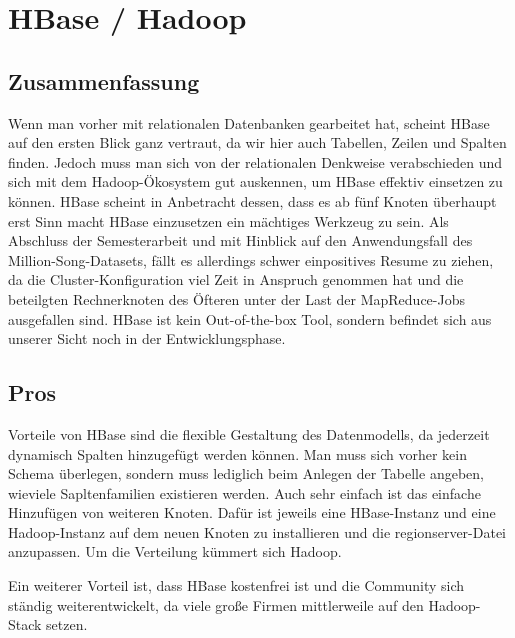 \section{HBase / Hadoop}
\subsection{Zusammenfassung}
Wenn man vorher mit relationalen Datenbanken gearbeitet hat, scheint HBase auf den ersten Blick ganz vertraut, da wir hier auch Tabellen, Zeilen und Spalten finden. Jedoch muss man sich von der relationalen Denkweise verabschieden und sich mit dem Hadoop-Ökosystem gut auskennen, um HBase effektiv einsetzen zu können. HBase scheint in Anbetracht dessen, dass es ab fünf Knoten überhaupt erst Sinn macht HBase einzusetzen ein mächtiges Werkzeug zu sein. Als Abschluss der Semesterarbeit und mit Hinblick auf den Anwendungsfall des Million-Song-Datasets, fällt es allerdings schwer einpositives Resume zu ziehen, da die Cluster-Konfiguration viel Zeit in Anspruch genommen hat und die beteilgten Rechnerknoten des Öfteren unter der Last der MapReduce-Jobs ausgefallen sind. HBase ist kein Out-of-the-box Tool, sondern befindet sich aus unserer Sicht noch in der Entwicklungsphase.

\subsection{Pros}
Vorteile von HBase sind die flexible Gestaltung des Datenmodells, da jederzeit dynamisch Spalten hinzugefügt werden können. Man muss sich vorher kein Schema überlegen, sondern muss lediglich beim Anlegen der Tabelle angeben, wieviele Sapltenfamilien existieren werden. Auch sehr einfach ist das einfache Hinzufügen von weiteren Knoten. Dafür ist jeweils eine HBase-Instanz und eine Hadoop-Instanz auf dem neuen Knoten zu installieren und die regionserver-Datei anzupassen. Um die Verteilung kümmert sich Hadoop.

Ein weiterer Vorteil ist, dass HBase kostenfrei ist und die Community sich ständig weiterentwickelt, da viele große Firmen mittlerweile auf den Hadoop-Stack setzen. 

